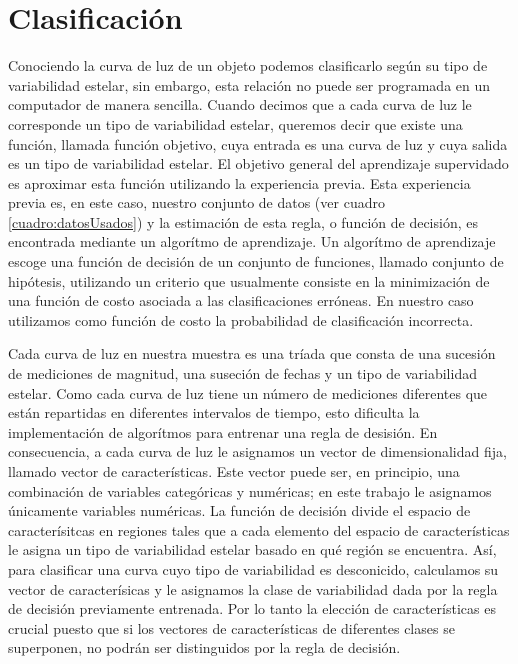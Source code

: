 \documentclass[letterpaper,12pt]{book}
\begin{document}
\chapter{Clasificación}\label{cap:clasificacion} 

Conociendo la curva de luz de un objeto podemos clasificarlo según su tipo de variabilidad estelar, sin embargo, esta relación no puede ser programada en un computador de manera sencilla. Cuando decimos que a cada curva de luz le corresponde un tipo de variabilidad estelar, queremos decir que existe una función, llamada función objetivo, cuya entrada es una curva de luz y cuya salida es un tipo de variabilidad estelar. El objetivo general del aprendizaje supervidado es aproximar esta función utilizando la experiencia previa. Esta experiencia previa es, en este caso, nuestro conjunto de datos (ver cuadro \ref{cuadro:datosUsados}) y la estimación de esta regla, o función de decisión, es encontrada mediante un algorítmo de aprendizaje. Un algorítmo de aprendizaje escoge una función de decisión de un conjunto de funciones, llamado conjunto de hipótesis, utilizando un criterio que usualmente consiste en la minimización de una función de costo asociada a las clasificaciones erróneas. En nuestro caso utilizamos como función de costo la probabilidad de clasificación incorrecta.

Cada curva de luz en nuestra muestra es una tríada que consta de una sucesión de mediciones de magnitud, una suseción de fechas y un tipo de variabilidad estelar. Como cada curva de luz tiene un número de mediciones diferentes que están repartidas en diferentes intervalos de tiempo, esto dificulta la implementación de algorítmos para entrenar una regla de desisión. En consecuencia, a cada curva de luz le asignamos un vector de dimensionalidad fija, llamado vector de características. Este vector puede ser, en principio, una combinación de variables categóricas y numéricas; en este trabajo le asignamos únicamente variables numéricas. La función de decisión divide el espacio de caracterísitcas en regiones tales que a cada elemento del espacio de características le asigna un tipo de variabilidad estelar basado en qué región se encuentra. Así, para clasificar una curva cuyo tipo de variabilidad es desconicido, calculamos su vector de caracterísicas y le asignamos la clase de variabilidad dada por la regla de decisión previamente entrenada. Por lo tanto la elección de características es crucial puesto que si los vectores de características de diferentes clases se superponen, no podrán ser distinguidos por la regla de decisión.
\end{document}
